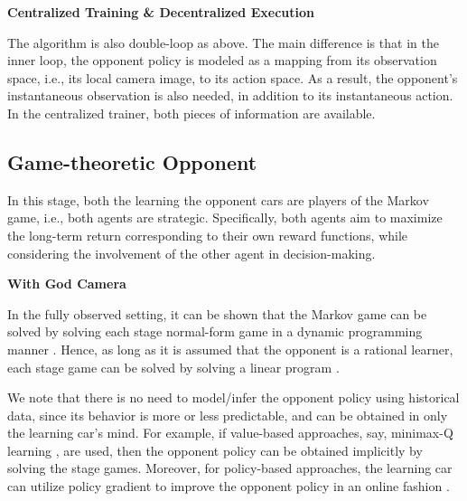 \vspace{7pt}
\noindent\textbf{Centralized Training \& Decentralized Execution}
\vspace{3pt}


The algorithm is also double-loop as above. The main difference is that in the inner loop, the opponent policy is modeled as a mapping from its observation space, i.e., its local camera image, to its action space. As a result, the opponent's instantaneous observation is also needed, in addition to its instantaneous action. In the centralized trainer, both pieces of information are available. 

 

\subsection{Game-theoretic Opponent}

In this stage, both the learning the opponent cars are players of the Markov game, i.e., both agents are strategic. Specifically, both agents aim to maximize the long-term return corresponding to their own reward functions, while considering the involvement of the other agent in decision-making. 


\vspace{7pt}
\noindent\textbf{With God Camera} 
\vspace{3pt}


In the fully observed setting, it can be shown that  the Markov game can be solved by solving each stage normal-form game in a dynamic programming manner \citep{littman1994markov}. Hence, as long as it is assumed that the opponent is a rational learner, each stage game can be solved by solving a linear program  \citep{myerson2013game}. 

We note that there is no need to model/infer the opponent policy using historical data, since its behavior is more or less predictable, and can be obtained in only the learning car's mind. For example, if value-based approaches, say, minimax-Q learning \citep{littman1994markov},  are used, then the opponent policy can be obtained  implicitly by solving the stage games.  Moreover, for policy-based approaches, the learning car  can utilize policy gradient to improve the opponent policy in an online fashion  \citep{pinto2017robust}.  

